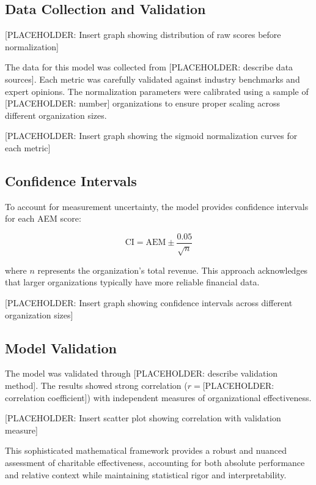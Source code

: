 \documentclass[12pt]{article}
\begin{document}
\subsection{Data Collection and Validation}

[PLACEHOLDER: Insert graph showing distribution of raw scores before normalization]

The data for this model was collected from [PLACEHOLDER: describe data sources]. Each metric was carefully validated against industry benchmarks and expert opinions. The normalization parameters were calibrated using a sample of [PLACEHOLDER: number] organizations to ensure proper scaling across different organization sizes.

[PLACEHOLDER: Insert graph showing the sigmoid normalization curves for each metric]

\subsection{Confidence Intervals}

To account for measurement uncertainty, the model provides confidence intervals for each AEM score:

\begin{equation}
    \text{CI} = \text{AEM} \pm \frac{0.05}{\sqrt{n}}
\end{equation}

where $n$ represents the organization's total revenue. This approach acknowledges that larger organizations typically have more reliable financial data.

[PLACEHOLDER: Insert graph showing confidence intervals across different organization sizes]

\subsection{Model Validation}

The model was validated through [PLACEHOLDER: describe validation method]. The results showed strong correlation ($r = $[PLACEHOLDER: correlation coefficient]) with independent measures of organizational effectiveness.

[PLACEHOLDER: Insert scatter plot showing correlation with validation measure]

This sophisticated mathematical framework provides a robust and nuanced assessment of charitable effectiveness, accounting for both absolute performance and relative context while maintaining statistical rigor and interpretability.
\end{document}
